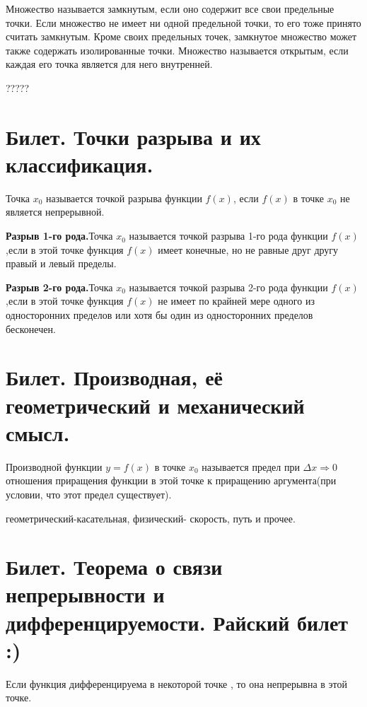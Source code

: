 \documentclass[12pt]{article}
\begin{document}
	Множество называется замкнутым, если оно содержит все свои предельные точки. Если множество не имеет ни одной предельной точки, то его тоже принято считать замкнутым. Кроме своих предельных точек, замкнутое множество может также содержать изолированные точки. Множество называется открытым, если каждая его точка является для него внутренней.
	
	?????
	
	\section{Билет. Точки разрыва и их классификация.}
	
	Точка $x_0$ называется точкой разрыва функции $f(x)$, если $f(x)$ в точке $x_0$ не является непрерывной.
	
	\textbf{Разрыв 1-го рода.}Точка $x_0$ называется точкой разрыва 1-го рода функции $f(x)$ ,если в этой точке функция $f(x)$ имеет конечные, но не равные друг другу правый и левый пределы.
	
	\textbf{Разрыв 2-го рода.}Точка $x_0$ называется точкой разрыва 2-го рода функции $f(x)$ ,если в этой точке функция $f(x)$ не имеет по крайней мере одного из односторонних пределов или хотя бы один из односторонних пределов бесконечен.
	
	\section{Билет. Производная, её геометрический и механический смысл.}
	
	Производной функции $y=f(x)$ в точке $x_0$ называется предел при $\Delta x \Rightarrow0$ отношения приращения функции в этой точке к приращению аргумента(при условии, что этот предел существует).
	
	геометрический-касательная, физический- скорость, путь и прочее.
	
	\section{Билет. Теорема о связи непрерывности и дифференцируемости. Райский билет :)}
	
	Если функция   дифференцируема в некоторой точке  , то она непрерывна в этой точке. 
	
\end{document}
